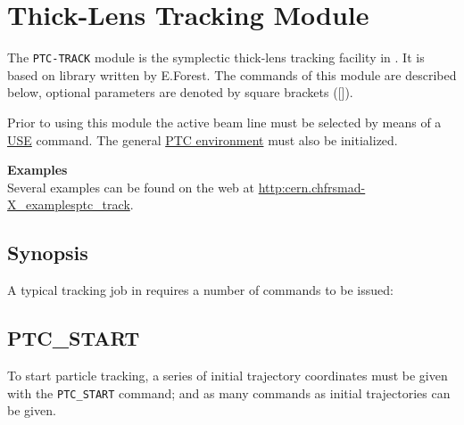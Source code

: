 

\chapter{Thick-Lens Tracking Module}
\label{chap:ptc_track}

The {\tt PTC-TRACK} module \cite{kapin2006} is the
symplectic thick-lens tracking facility in \madx \cite{schmidt2005}.
It is based on \ptc library \cite{forest2002} written by
E.Forest.  
The commands of this module are
described below, 
optional parameters are denoted by square brackets ([]). 

Prior to using this module the active beam line must be selected by
means of a \hyperref[sec:use]{USE} command.  
The general \hyperref[chap:ptc_general]{PTC environment} must
also be initialized.  

{\bf Examples}\\
Several examples can be found on the web at
\href{http://cern.ch/frs/mad-X_examples/ptc_track}{http:\/\/cern.ch\/frs\/mad-X\_examples\/ptc\_track}. 


\section{Synopsis}
\label{sec:ptc_track_synopsis}

A typical tracking job in \ptc requires a number of commands to be issued:



\section{PTC\_START}
\label{sec:ptc_start}

To start particle tracking, a series of initial trajectory coordinates
must be given with the {\tt PTC\_START} command;  and as many
commands as initial trajectories can be given. 

